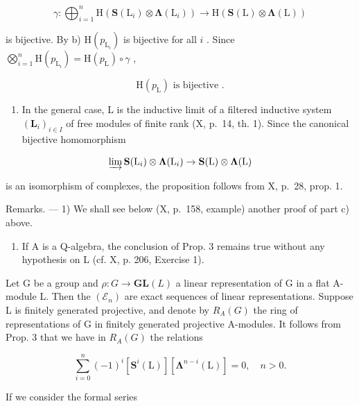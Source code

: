 \[
\gamma : \bigoplus_ {i = 1} ^ {n} \mathrm{H} (\mathbf {S} (\mathrm{L} _ {i}) \otimes \boldsymbol {\Lambda} (\mathrm{L} _ {i})) \rightarrow \mathrm{H} (\mathbf {S} (\mathrm{L}) \otimes \boldsymbol {\Lambda} (\mathrm{L}))
\]

is bijective. By b) \(\mathrm{H}(p_{\mathrm{L}_i})\) is bijective for all \(i\) . Since \(\bigotimes_{i=1}^{n} \mathrm{H}(p_{\mathrm{L}_i}) = \mathrm{H}(p_{\mathrm{L}}) \circ \gamma\) ,

\[
\mathrm{H} (p _ {\mathrm{L}}) \text {   is   bijective }  .
\]

\begin{enumerate}
\def\labelenumi{\alph{enumi})}
\setcounter{enumi}{3}
\tightlist
\item
  In the general case, L is the inductive limit of a filtered inductive system \((\mathbf{L}_{i})_{i\in I}\) of free modules of finite rank (X, p.~14, th. 1). Since the canonical bijective homomorphism
\end{enumerate}

\[
\varinjlim \mathbf {S} (\mathrm{L} _ {i}) \otimes \boldsymbol {\Lambda} (\mathrm{L} _ {i}) \rightarrow \mathbf {S} (\mathrm{L}) \otimes \boldsymbol {\Lambda} (\mathrm{L})
\]

is an isomorphism of complexes, the proposition follows from X, p.~28, prop. 1.

Remarks. --- 1) We shall see below (X, p.~158, example) another proof of part c) above.

\begin{enumerate}
\def\labelenumi{\arabic{enumi})}
\setcounter{enumi}{1}
\tightlist
\item
  If A is a Q-algebra, the conclusion of Prop. 3 remains true without any hypothesis on L (cf. X, p. 206, Exercise 1).
\end{enumerate}

Let G be a group and \(\rho: G \to \mathbf{GL}(L)\) a linear representation of G in a flat A-module L. Then the \((\mathcal{E}_n)\) are exact sequences of linear representations. Suppose L is finitely generated projective, and denote by \(R_A(G)\) the ring of representations of G in finitely generated projective A-modules. It follows from Prop. 3 that we have in \(R_{A}(G)\) the relations

\[
\sum_ {i = 0} ^ {n} (- 1) ^ {i} \left[ \mathbf {S} ^ {i} (\mathrm{L}) \right] \left[ \boldsymbol {\Lambda} ^ {n - i} (\mathrm{L}) \right] = 0, \quad n > 0.\tag{10}
\]

If we consider the formal series

